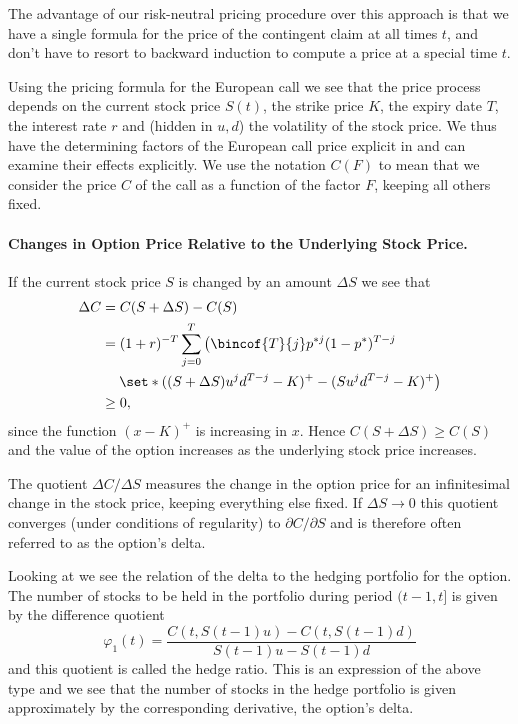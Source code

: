 The advantage of our risk-neutral pricing procedure over this approach is that we have a single formula for the price of the contingent claim at all times \(t\), and don't have to resort to backward induction to compute a price at a special time \(t\).

Using the pricing formula for the European call we see that the price process depends on the current stock price \(S(t)\), the strike price \(K\), the expiry date \(T\), the interest rate \(r\) and (hidden in \(u, d\)) the volatility of the stock price. We thus have the determining factors of the European call price explicit in  and can examine their effects explicitly. We use the notation \(C(F)\) to mean that we consider the price \(C\) of the call as a function of the factor \(F\), keeping all others fixed.

\paragraph{Changes in Option Price Relative to the Underlying Stock Price.}

If the current stock price \(S\) is changed by an amount \(\Delta S\) we see that
\begin{align*}
	\Delta C & = C(S + \Delta S) - C(S)                                                                 \\
	         & = (1+r)^{-T} \sum_{j=0}^{T} \left( \bincof{T}{j} p^{*j}(1 - p^{*})^{T-j} \right.         \\
	         & \quad \left. \set*{((S + \Delta S)u^j d^{T-j} - K)^{+} - (Su^j d^{T-j} - K)^{+}} \right) \\
	         & \geq 0,
\end{align*}
since the function \((x - K)^{+}\) is increasing in \(x\). Hence \(C(S + \Delta S) \geq C(S)\) and the value of the option increases as the underlying stock price increases.

The quotient \(\Delta C/\Delta S\) measures the change in the option price for an infinitesimal change in the stock price, keeping everything else fixed. If \(\Delta S \to 0\) this quotient converges (under conditions of regularity) to \(\partial C/\partial S\) and is therefore often referred to as the option's delta.

Looking at  we see the relation of the delta to the hedging portfolio for the option. The number of stocks to be held in the portfolio during period \((t - 1, t]\) is given by the difference quotient
\[
	\varphi_1(t) = \frac{C(t, S(t - 1)u) - C(t, S(t - 1)d)}{S(t - 1)u - S(t - 1)d}
\]
and this quotient is called the hedge ratio. This is an expression of the above type and we see that the number of stocks in the hedge portfolio is given approximately by the corresponding derivative, the option's delta.

